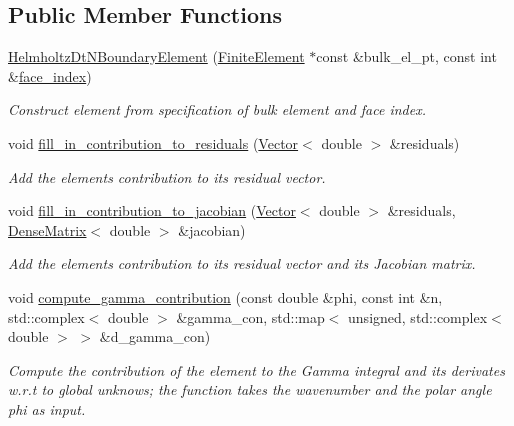 \subsection*{Public Member Functions}
\begin{DoxyCompactItemize}
\item 
\hyperlink{classoomph_1_1HelmholtzDtNBoundaryElement_a2d4a2e2bda9e359efe709b042b7948fe}{Helmholtz\+Dt\+N\+Boundary\+Element} (\hyperlink{classoomph_1_1FiniteElement}{Finite\+Element} $\ast$const \&bulk\+\_\+el\+\_\+pt, const int \&\hyperlink{classoomph_1_1FaceElement_a478d577ac6db67ecc80f1f02ae3ab170}{face\+\_\+index})
\begin{DoxyCompactList}\small\item\em Construct element from specification of bulk element and face index. \end{DoxyCompactList}\item 
void \hyperlink{classoomph_1_1HelmholtzDtNBoundaryElement_a963011242bb33d0e5d8cbd46dd878f9e}{fill\+\_\+in\+\_\+contribution\+\_\+to\+\_\+residuals} (\hyperlink{classoomph_1_1Vector}{Vector}$<$ double $>$ \&residuals)
\begin{DoxyCompactList}\small\item\em Add the element\textquotesingle{}s contribution to its residual vector. \end{DoxyCompactList}\item 
void \hyperlink{classoomph_1_1HelmholtzDtNBoundaryElement_afb3ab9366490295ba422a9c3fa7d6279}{fill\+\_\+in\+\_\+contribution\+\_\+to\+\_\+jacobian} (\hyperlink{classoomph_1_1Vector}{Vector}$<$ double $>$ \&residuals, \hyperlink{classoomph_1_1DenseMatrix}{Dense\+Matrix}$<$ double $>$ \&jacobian)
\begin{DoxyCompactList}\small\item\em Add the element\textquotesingle{}s contribution to its residual vector and its Jacobian matrix. \end{DoxyCompactList}\item 
void \hyperlink{classoomph_1_1HelmholtzDtNBoundaryElement_a5393d290b291de8434ead6cce873a376}{compute\+\_\+gamma\+\_\+contribution} (const double \&phi, const int \&n, std\+::complex$<$ double $>$ \&gamma\+\_\+con, std\+::map$<$ unsigned, std\+::complex$<$ double $>$ $>$ \&d\+\_\+gamma\+\_\+con)
\begin{DoxyCompactList}\small\item\em Compute the contribution of the element to the Gamma integral and its derivates w.\+r.\+t to global unknows; the function takes the wavenumber and the polar angle phi as input. \end{DoxyCompactList}\item 

\end{DoxyCompactItemize}
